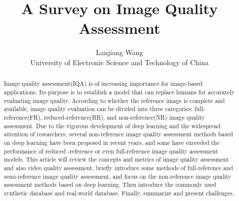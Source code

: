 \documentclass{article}
\title{A Survey on Image Quality Assessment}
\author{
Lanjiang Wang\\

University of Electronic Science and Technology of China \\
}
\begin{document}
\maketitle

\begin{abstract}

 Image quality assessment(IQA) is of increasing importance for image-based applications. Its purpose is to establish a model that can replace humans for accurately evaluating image quality. According to whether the reference image is complete and available, image quality evaluation can be divided into three categories: full-reference(FR), reduced-reference(RR), and non-reference(NR) image quality assessment. Due to the vigorous development of deep learning and the widespread attention of researchers, several non-reference image quality assessment methods based on deep learning have been proposed in recent years, and some have exceeded the performance of reduced -reference or even full-reference image quality assessment models. This article will review the concepts and metrics of image quality assessment and also video quality assessment, briefly introduce some methods of full-reference and semi-reference image quality assessment, and focus on the non-reference image quality assessment methods based on deep learning. Then introduce the commonly used synthetic database and real-world database. Finally, summarize and present challenges.

\end{abstract}
\end{document}
